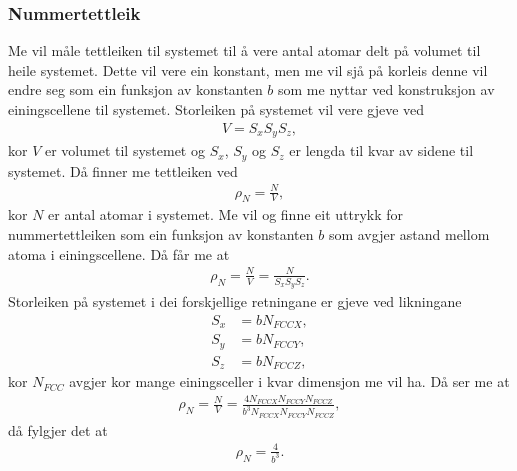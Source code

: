\documentclass[12pt, a4paper]{article}
\theoremstyle{definition} \newtheorem*{definition}{Teorem}
\begin{document}
        \subsubsection*{Nummertettleik}
            Me vil måle tettleiken til systemet til å vere antal atomar delt på volumet til heile systemet. Dette vil vere ein konstant, men me vil sjå på korleis denne vil 
            endre seg som ein funksjon av konstanten $b$ som me nyttar ved konstruksjon av einingscellene til systemet. Storleiken på systemet vil vere gjeve ved
            \begin{align*}
                V = S_xS_yS_z,
            \end{align*}
            kor $V$ er volumet til systemet og $S_x$, $S_y$ og $S_z$ er lengda til kvar av sidene til systemet. Då finner me tettleiken ved
            \begin{align*}
                \rho_N = \frac{N}{V},
            \end{align*}
            kor $N$ er antal atomar i systemet. Me vil og finne eit uttrykk for nummertettleiken som ein funksjon av konstanten $b$ som avgjer astand mellom atoma i 
            einingscellene. Då får me at
            \begin{align*}
                \rho_N = \frac{N}{V} = \frac{N}{S_xS_yS_z}.
            \end{align*}
            Storleiken på systemet i dei forskjellige retningane er gjeve ved likningane
            \begin{align*}
                S_x &= bN_{FCCX}, \\
                S_y &= bN_{FCCY}, \\
                S_z &= bN_{FCCZ},
            \end{align*}
            kor $N_{FCC}$ avgjer kor mange einingsceller i kvar dimensjon me vil ha. Då ser me at 
            \begin{align*}
                \rho_N = \frac{N}{V} = \frac{4N_{FCCX}N_{FCCY}N_{FCCZ}}{b^3N_{FCCX}N_{FCCY}N_{FCCZ}},
            \end{align*}
            då fylgjer det at
            \begin{align*}
                \rho_N = \frac{4}{b^3}.
            \end{align*}
\end{document}
